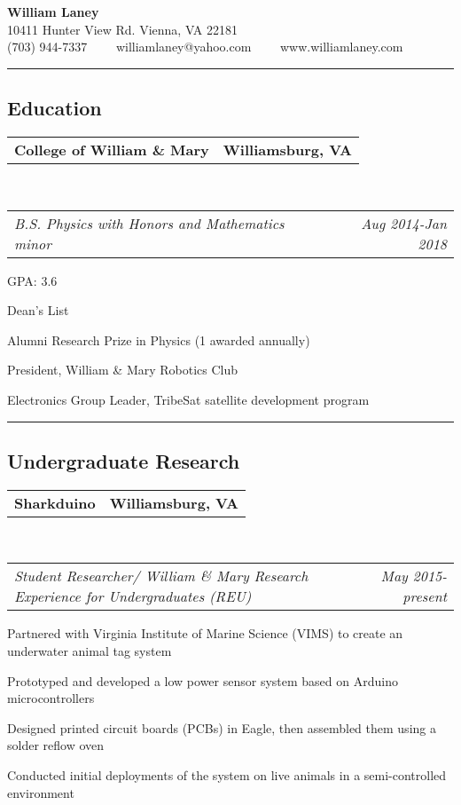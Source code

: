 \documentclass[10pt,letterpaper]{article}
\makeatletter
\newcommand{\headerrow}[2]
{\begin{tabular*}{\linewidth}{l@{\extracolsep{\fill}}r}
	#1 &
	#2 \\
\end{tabular*}}
\makeatother
\begin{document}
\begin{center}
{\LARGE \textbf{William Laney}}\\
\vspace{0.1em}
10411 Hunter View Rd.
Vienna, VA 22181
\\
(703) 944-7337\ \ \textbullet
\ \ williamlaney@yahoo.com\ \ \textbullet
\ \ www.williamlaney.com
\end{center}

\hrule
\vspace{-0.4em}
\subsection*{Education}

	\headerrow
		{\textbf{College of William \& Mary}}
		{\textbf{Williamsburg, VA}}
	\\
	\headerrow
		{\emph{B.S. Physics with Honors and Mathematics minor}}
		{\emph{Aug 2014-Jan 2018}}
	\begin{itemize*}
		\item GPA: 3.6
		\item Dean's List
		\item Alumni Research Prize in Physics (1 awarded annually)
		\item President, William \& Mary Robotics Club
		\item Electronics Group Leader, TribeSat satellite development program
	\end{itemize*}

\hrule
\vspace{-0.4em}
\subsection*{Undergraduate Research}

	\headerrow
		{\textbf{Sharkduino}}
		{\textbf{Williamsburg, VA}}
	\\
	\headerrow
		{\emph{Student Researcher/ William \& Mary Research Experience for Undergraduates (REU)}}
		{\emph{May 2015-present}}
	\begin{itemize*}
	\item Partnered with Virginia Institute of Marine Science (VIMS) to create an underwater animal tag system
	\item Prototyped and developed a low power sensor system based on Arduino microcontrollers
	\item Designed printed circuit boards (PCBs) in Eagle, then assembled them using a solder reflow oven
	\item Conducted initial deployments of the system on live animals in a semi-controlled environment
	
	\end{itemize*}
	
\end{document}
